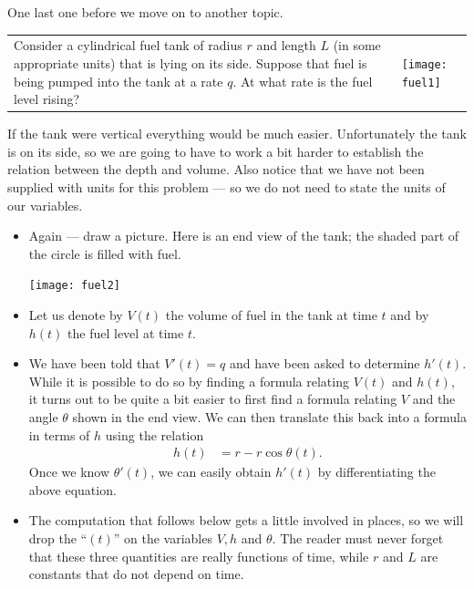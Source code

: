 One last one before we move on to another topic.
\begin{eg}\label{eg:fuel}
\begin{tabular}{m{}m{}}
Consider a cylindrical fuel tank of radius $r$ and length $L$ (in some appropriate units)
that is lying on its side. Suppose that fuel is being pumped into the tank at
a rate $q$. At what rate is the fuel level rising?
%
&
%
\quad\texttt{[image: fuel1]}
\end{tabular}


\soln If the tank were vertical everything would be much easier. Unfortunately the tank
is on its side, so we are going to have to work a bit harder to establish the relation
between the depth and volume. Also notice that we have not been supplied with units for
this problem --- so we do not need to state the units of our variables.

\begin{itemize}
 \item Again --- draw a picture. Here is an end view of the tank; the shaded part of the
circle  is filled with fuel.

\begin{efig}
\begin{center}
    \texttt{[image: fuel2]}
\end{center}
\end{efig}

\item Let us denote by $V(t)$ the volume of fuel in the tank at time
$t$ and by $h(t)$ the fuel level at time $t$.

\item We have been told that $V'(t)=q$ and have been asked to determine $h'(t)$. While it is
possible to do so by finding a formula relating $V(t)$ and $h(t)$, it turns out to be
quite a bit easier to first find a formula relating $V$ and the angle $\theta$ shown in
the end view. We can then translate this back into a formula in terms of $h$ using the
relation
\begin{align*}
  h(t) &= r - r\cos \theta(t).
\end{align*}
Once we know $\theta'(t)$, we can easily obtain $h'(t)$ by differentiating the above
equation.

\item The computation that follows below gets a little involved in places, so we will
drop the ``$(t)$'' on the variables $V,h$ and $\theta$. The reader must never forget that
these three quantities are really functions of time, while $r$ and $L$ are constants that
do not depend on time.


\end{itemize}
\end{eg}
